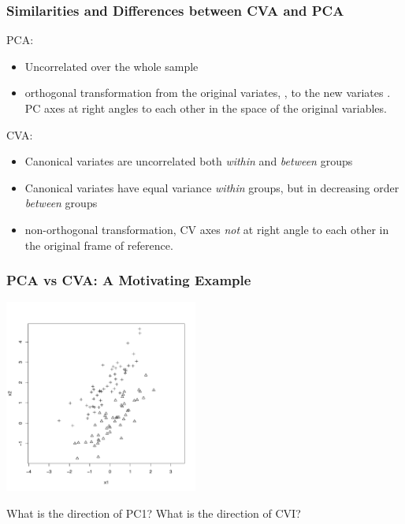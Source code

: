 \documentclass{beamer}
\begin{document}
\begin{frame}
  \frametitle{Similarities and Differences between CVA and PCA}
  
PCA:
\begin{itemize}
\item Uncorrelated over the whole sample
\item orthogonal transformation from the original variates, , to the new variates . PC axes at right angles to each other in the space of the original variables.
\end{itemize}

CVA:
\begin{itemize}
\item Canonical variates are uncorrelated both \emph{within} and \emph{between} groups
\item Canonical variates have equal variance \emph{within} groups, but in decreasing order \emph{between} groups
\item non-orthogonal transformation, CV axes \emph{not} at right angle to each other in the original frame of reference.
\end{itemize}
\end{frame}



\begin{frame}
  \frametitle{PCA vs CVA: A Motivating Example}

\begin{center}
\includegraphics[height=2.5in]{simple2group}

What is the direction of PC1? What is the direction of CVI?
\end{center}

\end{frame}
\end{document}
